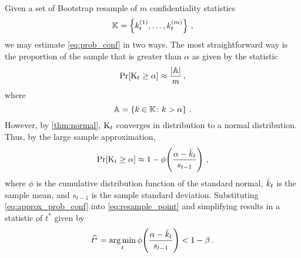 \documentclass[ ../main.tex]{subfiles}
\begin{document}
Given a set of Bootstrap resample of $m$ confidentiality statistics
\[
    \mathbb{K} = \left\{k_t^{(1)},\ldots,k_t^{(m)}\right\}\,,
\]
we may estimate \cref{eq:prob_conf} in two ways. The most straightforward way is the proportion of the sample that is greater than $\alpha$ as given by the statistic
\begin{equation}
    \Pr[\mathrm{K}_t \geq \alpha] \approx \frac{\left\vert{\mathbb{A}}\right\vert}{m}\,,
\end{equation}
where
\begin{equation}
    \mathbb{A} = \left\{k \in \mathbb{K} \colon k > \alpha\right\}\,.
\end{equation}
However, by \cref{thm:normal}, $\mathrm{K}_t$ converges in distribution to a normal distribution. Thus, by the large sample approximation,
\begin{equation}
\label{eq:approx_prob_conf}
    \Pr[\mathrm{K}_t \geq \alpha] \approx 1 - \phi\!\left(\frac{\alpha - \bar{k}_t}{s_{t-1}}\right)\,,
\end{equation}
where $\phi$ is the cumulative distribution function of the standard normal, $\bar{k}_t$ is the sample mean, and $s_{t-1}$ is the sample standard deviation. Substituting \cref{eq:approx_prob_conf} into \cref{eq:resample_point} and simplifying results in a statistic of $t^*$ given by
\begin{equation}
    \widehat{t^*} = \operatorname*{arg\,min}_{t} \phi\!\left(\frac{\alpha - \bar{k}_t}{s_{t-1}}\right) < 1 - \beta\,.
\end{equation}
\end{document}

